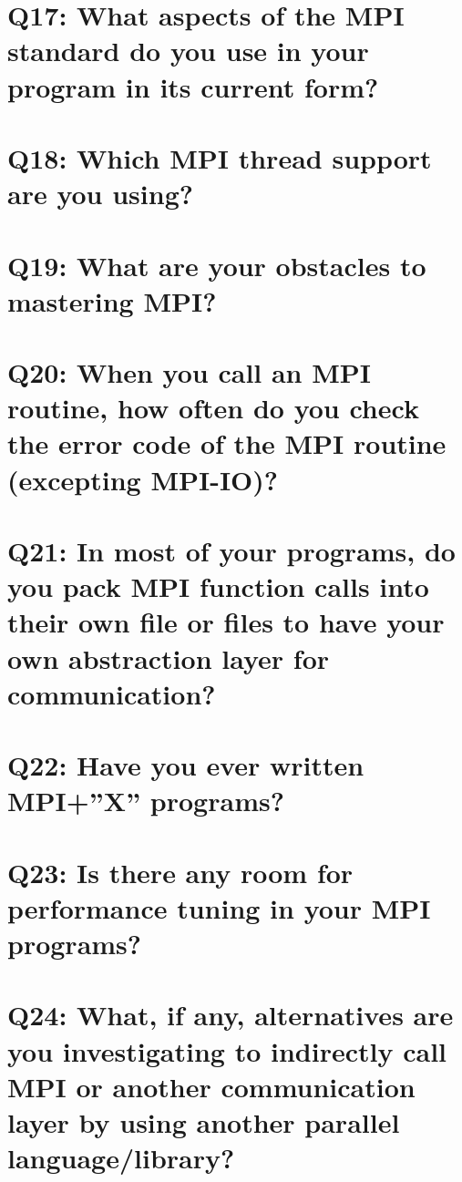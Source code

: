 \documentclass{report}
\begin{document}
\clearpage
\section{Q17: What aspects of the MPI standard do you use in your program in its current form?}


\clearpage
\section{Q18: Which MPI thread support are you using?}


\clearpage
\section{Q19: What are your obstacles to mastering MPI?}


\clearpage
\section{Q20: When you call an MPI routine, how often do you check the error code of the MPI routine  (excepting MPI-IO)?}


\clearpage
\section{Q21: In most of your programs, do you pack MPI function calls into their own file or files to have your own abstraction layer for communication?}


\clearpage
\section{Q22: Have you ever written MPI+”X” programs?}


\clearpage
\section{Q23: Is there any room for performance tuning in your MPI programs?}


\clearpage
\section{Q24: What, if any, alternatives are you investigating to indirectly call MPI or another communication layer by using another parallel language/library?}

\end{document}
